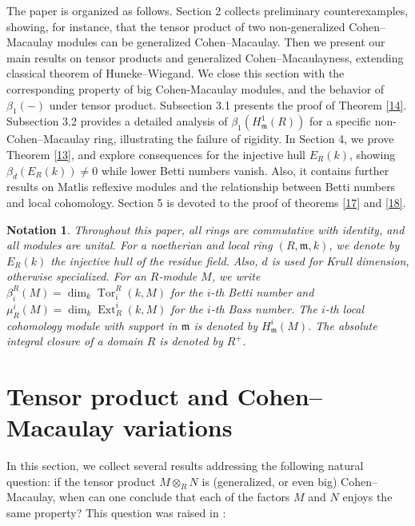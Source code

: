 \documentclass[11pt,a4paper]{amsart}
\numberwithin{equation}{section}
\newtheorem{notation}[theorem]{Notation}
\theoremstyle{definition}
\theoremstyle{remark}
\begin{document}
 
	

	


The paper is organized as follows. Section 2 collects preliminary counterexamples, showing, for instance, that the tensor product of two non-generalized Cohen--Macaulay modules can be generalized Cohen--Macaulay. Then we present our main results on tensor products and generalized Cohen--Macaulayness, extending classical theorem  of Huneke--Wiegand. 
	We close this section with the corresponding property of big Cohen-Macaulay modules, and the behavior of $\beta_1(-)$ under tensor product. 
Subsection 3.1 presents the proof of {Theorem} \ref{14}.
	Subsection 3.2 provides a detailed analysis of \(\beta_1(H^1_{\mathfrak{m}}(R))\) for a specific non-Cohen--Macaulay ring, illustrating the failure of rigidity.
In Section 4, we prove {Theorem} \ref{13}, and explore consequences for the injective hull \(E_R(k)\), showing \(\beta_d(E_R(k))\neq 0\) while lower Betti numbers vanish.  Also, it contains further results on Matlis reflexive modules and the relationship between Betti numbers and local cohomology.
	Section 5 is devoted to the proof of theorems  \ref{17} and \ref{18}.  


	

	
\begin{notation}	Throughout this paper, all rings are commutative   with identity, and all modules are unital. For a noetherian  and local ring \((R,\mathfrak{m},k)\), we denote by \(E_R(k)\) the injective hull of the residue field. Also, $d$ is used for Krull dimension, otherwise specialized. For an \(R\)-module \(M\), we write \(\beta_i^R(M)=\dim_k \operatorname{Tor}_i^R(k,M)\) for the \(i\)-th Betti number and \(\mu^i_R(M)=\dim_k \operatorname{Ext}_R^i(k,M)\) for the \(i\)-th Bass number. The \(i\)-th local cohomology module with support in \(\mathfrak{m}\) is denoted by \(H^i_{\mathfrak{m}}(M)\). The absolute integral closure of a domain \(R\) is denoted by \(R^+\).
	\end{notation}

	
	\section{Tensor product and  Cohen--Macaulay variations}
	
In this section, we collect several results addressing the following natural question: if the tensor product \(M \otimes_R N\) is (generalized, or even big) Cohen--Macaulay, when can one conclude that each of the factors \(M\) and \(N\) enjoys the same property? This question was raised in   \cite[Question 1.1]{cel}:
	
\end{document}
